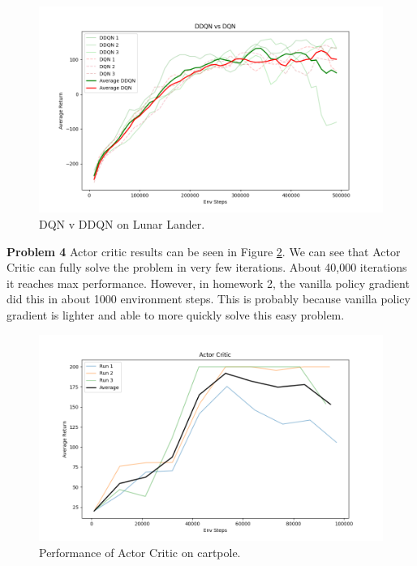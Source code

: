 \documentclass[11pt]{article}
\begin{document}
\begin{figure}[h] 
    \centering
    \includegraphics[width=0.95 \linewidth]{hw3_q2_all.png}
    \caption{DQN v DDQN on Lunar Lander.}
    \label{fig:q2_all}
\end{figure}


\large{\textbf{Problem 4}}
Actor critic results can be seen in Figure \ref{fig:ac}.
We can see that Actor Critic can fully solve the problem in very few iterations.
About 40,000 iterations it reaches max performance. However, in homework 2,
the vanilla policy gradient did this in about 1000 environment steps. 
This is probably because vanilla policy gradient is lighter and able to more quickly solve this easy problem.

\begin{figure}[h] 
    \centering
    \includegraphics[width=0.95 \linewidth]{hw3_q4.png}
    \caption{Performance of Actor Critic on cartpole.}
    \label{fig:ac}
\end{figure}
\end{document}
